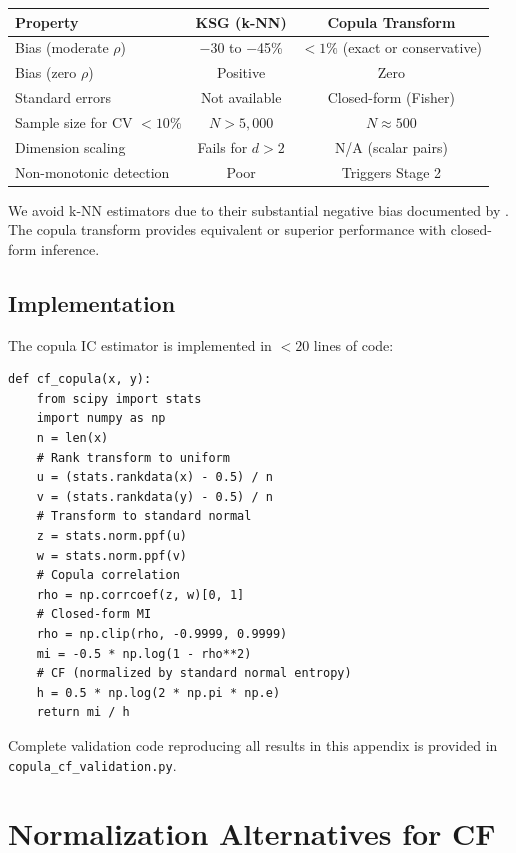\documentclass[10pt]{article} %
\theoremstyle{plain}
\theoremstyle{definition}
\begin{document}
\begin{center}
\begin{tabular}{lcc}
\toprule
Property & KSG (k-NN) & Copula Transform \\
\midrule
Bias (moderate $\rho$) & $-$30 to $-$45\% & $< 1\%$ (exact or conservative) \\
Bias (zero $\rho$) & Positive & Zero \\
Standard errors & Not available & Closed-form (Fisher) \\
Sample size for CV $< 10\%$ & $N > 5{,}000$ & $N \approx 500$ \\
Dimension scaling & Fails for $d > 2$ & N/A (scalar pairs) \\
Non-monotonic detection & Poor & Triggers Stage 2 \\
\bottomrule
\end{tabular}
\end{center}

We avoid k-NN estimators due to their substantial negative bias documented by \citet{vandenberg2025linfoot}. The copula transform provides equivalent or superior performance with closed-form inference.

\subsection{Implementation}

The copula IC estimator is implemented in $<20$ lines of code:

\begin{verbatim}
def cf_copula(x, y):
    from scipy import stats
    import numpy as np
    n = len(x)
    # Rank transform to uniform
    u = (stats.rankdata(x) - 0.5) / n
    v = (stats.rankdata(y) - 0.5) / n
    # Transform to standard normal
    z = stats.norm.ppf(u)
    w = stats.norm.ppf(v)
    # Copula correlation
    rho = np.corrcoef(z, w)[0, 1]
    # Closed-form MI
    rho = np.clip(rho, -0.9999, 0.9999)
    mi = -0.5 * np.log(1 - rho**2)
    # CF (normalized by standard normal entropy)
    h = 0.5 * np.log(2 * np.pi * np.e)
    return mi / h
\end{verbatim}

Complete validation code reproducing all results in this appendix is provided in \texttt{copula\_cf\_validation.py}.

\section{Normalization Alternatives for CF}
\label{app:normalization}
\end{document}
